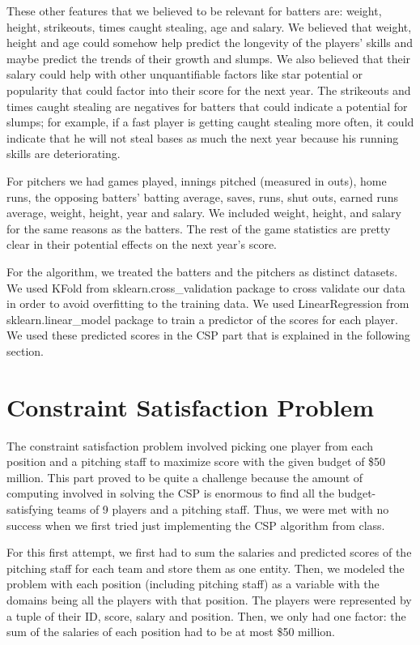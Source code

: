 \documentclass[12pt]{amsart}
\begin{document}
These other features that we believed to be relevant for batters are: weight, height, strikeouts, times caught stealing, age and salary. We believed that weight, height and age could somehow help predict the longevity of the players' skills and maybe predict the trends of their growth and slumps. We also believed that their salary could help with other unquantifiable factors like star potential or popularity that could factor into their score for the next year. The strikeouts and times caught stealing are negatives for batters that could indicate a potential for slumps; for example, if a fast player is getting caught stealing more often, it could indicate that he will not steal bases as much the next year because his running skills are deteriorating. 
\vspace{.4cm}

For pitchers we had games played, innings pitched (measured in outs), home runs, the opposing batters' batting average, saves, runs, shut outs, earned runs average, weight, height, year and salary. We included weight, height, and salary for the same reasons as the batters. The rest of the game statistics are pretty clear in their potential effects on the next year's score. 
\vspace{.4cm}

For the algorithm, we treated the batters and the pitchers as distinct datasets. We used KFold from sklearn.cross\_validation package to cross validate our data in order to avoid overfitting to the training data. We used LinearRegression from sklearn.linear\_model package to train a predictor of the scores for each player. We used these predicted scores in the CSP part that is explained in the following section.
\section{\large Constraint Satisfaction Problem}
The constraint satisfaction problem involved picking one player from each position and a pitching staff to maximize score with the given budget of \$50 million. This part proved to be quite a challenge because the amount of computing involved in solving the CSP is enormous to find all the budget-satisfying teams of 9 players and a pitching staff. Thus, we were met with no success when we first tried just implementing the CSP algorithm from class.
\vspace{.4cm}

For this first attempt, we first had to sum the salaries and predicted scores of the pitching staff for each team and store them as one entity. Then, we modeled the problem with each position (including pitching staff) as a variable with the domains being all the players with that position. The players were represented by a tuple of their ID, score, salary and position. Then, we only had one factor: the sum of the salaries of each position had to be at most \$50 million.
\vspace{.4cm}
\end{document}
